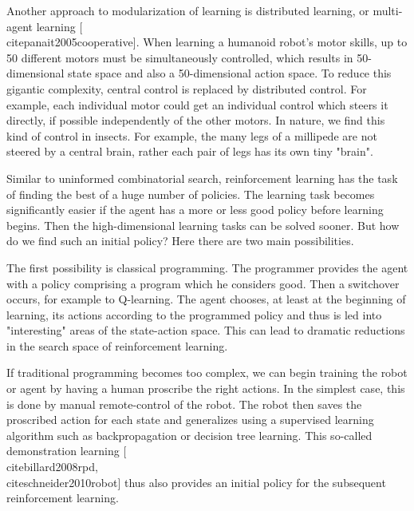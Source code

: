 \documentclass[10pt]{book}
\begin{document}
Another approach to modularization of learning is distributed learning, or multi-agent learning [\\cite{panait2005cooperative}]. When learning a humanoid robot's motor skills, up to 50 different motors must be simultaneously controlled, which results in 50-dimensional state space and also a 50-dimensional action space. To reduce this gigantic complexity, central control is replaced by distributed control. For example, each individual motor could get an individual control which steers it directly, if possible independently of the other motors. In nature, we find this kind of control in insects. For example, the many legs of a millipede are not steered by a central brain, rather each pair of legs has its own tiny "brain".

Similar to uninformed combinatorial search, reinforcement learning has the task of finding the best of a huge number of policies. The learning task becomes significantly easier if the agent has a more or less good policy before learning begins. Then the high-dimensional learning tasks can be solved sooner. But how do we find such an initial policy? Here there are two main possibilities.

The first possibility is classical programming. The programmer provides the agent with a policy comprising a program which he considers good. Then a switchover occurs, for example to Q-learning. The agent chooses, at least at the beginning of learning, its actions according to the programmed policy and thus is led into "interesting" areas of the state-action space. This can lead to dramatic reductions in the search space of reinforcement learning.

If traditional programming becomes too complex, we can begin training the robot or agent by having a human proscribe the right actions. In the simplest case, this is done by manual remote-control of the robot. The robot then saves the proscribed action for each state and generalizes using a supervised learning algorithm such as backpropagation or decision tree learning. This so-called demonstration learning [\\cite{billard2008rpd}, \\cite{schneider2010robot}] thus also provides an initial policy for the subsequent reinforcement learning.
\end{document}

